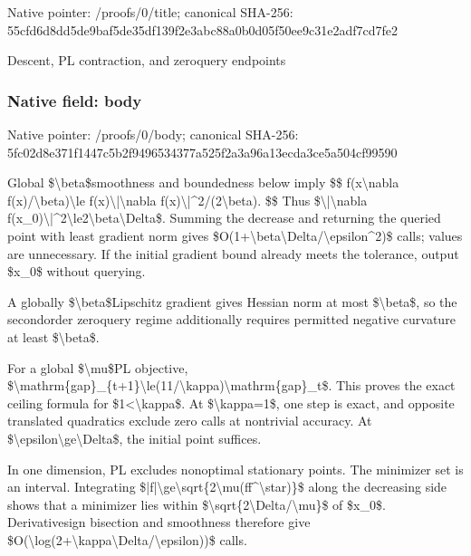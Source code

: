 \documentclass[10pt,a4paper]{article}
\begin{document}
Native pointer: /proofs/0/title; canonical SHA-256: 55cfd6d8dd5de9baf5de35df\allowbreak{}139f2e3abc88a0b0d05f50ee\allowbreak{}9c31e2adf7cd7fe2


Descent, PL contraction, and zeroquery endpoints


\subsubsection{Native field: body}


Native pointer: /proofs/0/body; canonical SHA-256: 5fc02d8e371f1447c5b2f949\allowbreak{}6534377a525f2a3a96a13ecd\allowbreak{}a3ce5a504cf99590


Global \$\textbackslash{}beta\$smoothness and boundedness below imply
\$\$
f(x\textbackslash{}nabla f(x)/\textbackslash{}beta)\textbackslash{}le f(x)\textbackslash{}|\textbackslash{}nabla f(x)\textbackslash{}|\textasciicircum{}2/(2\textbackslash{}beta).
\$\$
Thus \$\textbackslash{}|\textbackslash{}nabla f(x\_0)\textbackslash{}|\textasciicircum{}2\textbackslash{}le2\textbackslash{}beta\textbackslash{}Delta\$. Summing the decrease and returning the queried point with least gradient norm gives \$O(1+\textbackslash{}beta\textbackslash{}Delta/\textbackslash{}epsilon\textasciicircum{}2)\$ calls; values are unnecessary. If the initial gradient bound already meets the tolerance, output \$x\_0\$ without querying.

A globally \$\textbackslash{}beta\$Lipschitz gradient gives Hessian norm at most \$\textbackslash{}beta\$, so the secondorder zeroquery regime additionally requires permitted negative curvature at least \$\textbackslash{}beta\$.

For a global \$\textbackslash{}mu\$PL objective,
\$\textbackslash{}mathrm\{gap\}\_\{t+1\}\textbackslash{}le(1\allowbreak{}1/\textbackslash{}kappa)\textbackslash{}mathrm\{gap\}\_t\allowbreak{}\$.
This proves the exact ceiling formula for \$1<\textbackslash{}kappa\$. At \$\textbackslash{}kappa=1\$, one step is exact, and opposite translated quadratics exclude zero calls at nontrivial accuracy. At \$\textbackslash{}epsilon\textbackslash{}ge\textbackslash{}Delta\$, the initial point suffices.

In one dimension, PL excludes nonoptimal stationary points. The minimizer set is an interval. Integrating
\$|f|\textbackslash{}ge\textbackslash{}sqrt\{2\textbackslash{}mu(ff\textasciicircum{}\textbackslash{}star)\}\$
along the decreasing side shows that a minimizer lies within \$\textbackslash{}sqrt\{2\textbackslash{}Delta/\textbackslash{}mu\}\$ of \$x\_0\$. Derivativesign bisection and smoothness therefore give \$O(\textbackslash{}log(2+\textbackslash{}kappa\textbackslash{}Delta/\textbackslash{}epsilon))\$ calls.
\end{document}
